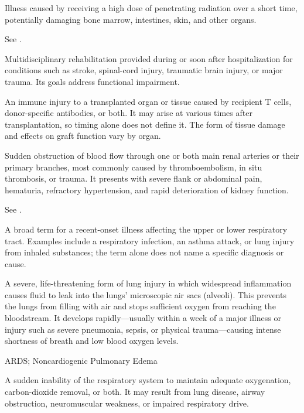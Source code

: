  Illness caused by receiving a high dose of penetrating radiation over a short time, potentially damaging bone marrow, intestines, skin, and other organs.

 See .

 Multidisciplinary rehabilitation provided during or soon after hospitalization for conditions such as stroke,
spinal-cord injury, traumatic brain injury, or major trauma. Its goals address functional impairment.

 An immune injury to a transplanted organ or tissue caused by recipient T
cells, donor-specific antibodies, or both. It may arise at various times after transplantation, so
timing alone does not define it. The form of tissue damage and effects on graft function vary by organ.

 Sudden obstruction of blood flow through one or both main renal arteries or their primary branches, most commonly caused by thromboembolism, in situ thrombosis, or trauma. It presents with severe flank or abdominal pain, hematuria, refractory hypertension, and rapid deterioration of kidney function.

 See .

 A broad term for a recent-onset illness affecting the upper or lower respiratory tract. Examples include a respiratory infection, an asthma attack, or lung injury from inhaled substances; the term alone does not name a specific diagnosis or cause.

 A severe, life-threatening form of lung injury in which widespread inflammation causes fluid to leak into the lungs' microscopic air sacs (alveoli). This prevents the lungs from filling with air and stops sufficient oxygen from reaching the bloodstream. It develops rapidly---usually within a week of a major illness or injury such as severe pneumonia, sepsis, or physical trauma---causing intense shortness of breath and low blood oxygen levels.

\synonyms
ARDS; Noncardiogenic Pulmonary Edema

 A sudden inability of the respiratory system to maintain adequate oxygenation, carbon-dioxide removal, or both. It may result from lung disease, airway obstruction, neuromuscular weakness, or impaired respiratory drive.

